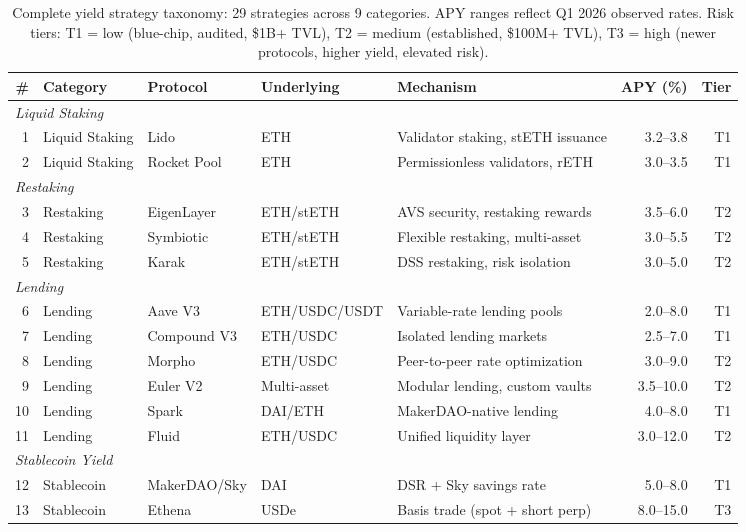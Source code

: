\documentclass[11pt,twocolumn]{article}
\begin{document}
\begin{table}[t]
\centering
\small
\caption{Complete yield strategy taxonomy: 29 strategies across 9 categories. APY ranges reflect Q1 2026 observed rates. Risk tiers: T1 = low (blue-chip, audited, \$1B+ TVL), T2 = medium (established, \$100M+ TVL), T3 = high (newer protocols, higher yield, elevated risk).}
\label{tab:full_strategies}
\begin{tabular}{@{}rllllrr@{}}
\toprule
\textbf{\#} & \textbf{Category} & \textbf{Protocol} & \textbf{Underlying} & \textbf{Mechanism} & \textbf{APY (\%)} & \textbf{Tier} \\
\midrule
\multicolumn{7}{l}{\textit{Liquid Staking}} \\
1 & Liquid Staking & Lido & ETH & Validator staking, stETH issuance & 3.2--3.8 & T1 \\
2 & Liquid Staking & Rocket Pool & ETH & Permissionless validators, rETH & 3.0--3.5 & T1 \\
\midrule
\multicolumn{7}{l}{\textit{Restaking}} \\
3 & Restaking & EigenLayer & ETH/stETH & AVS security, restaking rewards & 3.5--6.0 & T2 \\
4 & Restaking & Symbiotic & ETH/stETH & Flexible restaking, multi-asset & 3.0--5.5 & T2 \\
5 & Restaking & Karak & ETH/stETH & DSS restaking, risk isolation & 3.0--5.0 & T2 \\
\midrule
\multicolumn{7}{l}{\textit{Lending}} \\
6 & Lending & Aave V3 & ETH/USDC/USDT & Variable-rate lending pools & 2.0--8.0 & T1 \\
7 & Lending & Compound V3 & ETH/USDC & Isolated lending markets & 2.5--7.0 & T1 \\
8 & Lending & Morpho & ETH/USDC & Peer-to-peer rate optimization & 3.0--9.0 & T2 \\
9 & Lending & Euler V2 & Multi-asset & Modular lending, custom vaults & 3.5--10.0 & T2 \\
10 & Lending & Spark & DAI/ETH & MakerDAO-native lending & 4.0--8.0 & T1 \\
11 & Lending & Fluid & ETH/USDC & Unified liquidity layer & 3.0--12.0 & T2 \\
\midrule
\multicolumn{7}{l}{\textit{Stablecoin Yield}} \\
12 & Stablecoin & MakerDAO/Sky & DAI & DSR + Sky savings rate & 5.0--8.0 & T1 \\
13 & Stablecoin & Ethena & USDe & Basis trade (spot + short perp) & 8.0--15.0 & T3 \\

\end{tabular}
\end{table}
\end{document}
